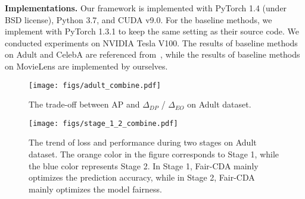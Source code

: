 \documentclass[letterpaper]{article} %
\begin{document}


\noindent\textbf{Implementations.} Our framework is implemented with PyTorch 1.4 (under BSD license), Python 3.7, and CUDA v9.0. For the baseline methods, we implement with PyTorch 1.3.1 to keep the same setting as their source code. We conducted experiments on NVIDIA Tesla V100. The results of baseline methods on Adult and CelebA are referenced from~\cite{chuang2021fair}, while the results of baseline methods on MovieLens are implemented by ourselves.


\begin{figure}[t]
\centering
 \texttt{[image: figs/adult\_combine.pdf]}
\caption{%
The trade-off between AP and $\Delta_{DP}$ / $\Delta_{EO}$ on Adult dataset.}  %
\label{fig:adult_dataset}
\end{figure}


\begin{figure}[t]
\centering
\texttt{[image: figs/stage\_1\_2\_combine.pdf]}
\caption{The trend of loss and performance during two stages on Adult dataset. The orange color in the figure corresponds to Stage 1, while the blue color represents Stage 2. In Stage 1, Fair-CDA mainly optimizes the prediction accuracy, while in Stage 2, Fair-CDA mainly optimizes the model fairness.}
\label{fig:stage_curve}
\end{figure}
\end{document}
